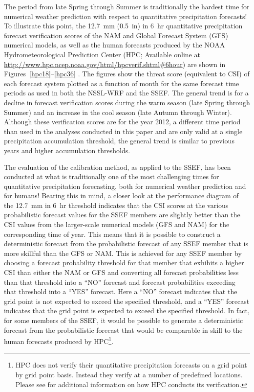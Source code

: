 The period from late Spring through Summer is traditionally the hardest time for numerical weather prediction with respect to quantitative precipitation forecasts!
To illustrate this point, the \mbox{12.7 mm} (\mbox{0.5 in}) in \mbox{6 hr} quantitative precipitation forecast verification scores of the NAM and Global Forecast System (GFS) numerical models, as well as the human forecasts produced by the NOAA Hydrometeorological Prediction Center (HPC; Available online at \url{http://www.hpc.ncep.noaa.gov/html/hpcverif.shtml#6hour}) are shown in \mbox{Figures \ref{hpc18}--\ref{hpc36}} .
The figures show the threat score (equivalent to CSI) of each forecast system plotted as a function of month for the same forecast time periods as used in both the NSSL-WRF and the SSEF.
The general trend is for a decline in forecast verification scores during the warm season (late Spring through Summer) and an increase in the cool season (late Autumn through Winter).
Although these verification scores are for the year 2012, a different time period than used in the analyses conducted in this paper and are only valid at a single precipitation accumulation threshold, the general trend is similar to previous years and higher accumulation thresholds.


The evaluation of the calibration method, as applied to the SSEF, has been conducted at what is traditionally one of the most challenging times for quantitative precipitation forecasting, both for numerical weather prediction and for humans!
Bearing this in mind, a closer look at the performance diagram of the \mbox{12.7 mm} in \mbox{6 hr} threshold indicates that the CSI scores at the various probabilistic forecast values for the SSEF members are slightly better than the CSI values from the larger-scale numerical models (GFS and NAM) for the corresponding time of year.
This means that it is possible to construct a deterministic forecast from the probabilistic forecast of any SSEF member that is more skillful than the GFS or NAM.
This is achieved for any SSEF member by choosing a forecast probability threshold for that member that exhibits a higher CSI than either the NAM or GFS and converting all forecast probabilities less than that threshold into a ``NO'' forecast and forecast probabilities exceeding that threshold into a ``YES'' forecast.
Here a ``NO'' forecast indicates that the grid point is not expected to exceed the specified threshold, and a ``YES'' forecast indicates that the grid point is expected to exceed the specified threshold.
In fact, for some members of the SSEF, it would be possible to generate a deterministic forecast from the probabilistic forecast that would be comparable in skill to the human forecasts produced by HPC\footnote{HPC does not verify their quantitative precipitation forecasts on a grid point by grid point basis.
Instead they verify at a number of predefined locations.
Please see \cite{Olsen1995} for additional information on how HPC conducts its verification.}.


